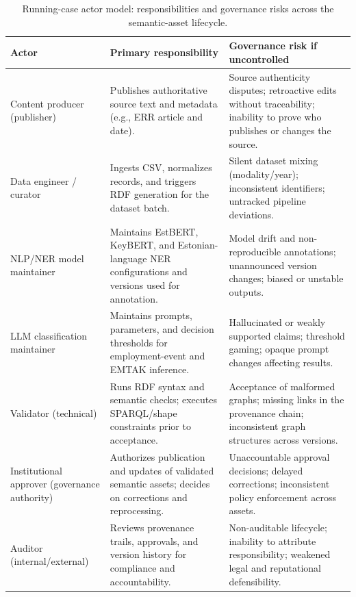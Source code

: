 \documentclass[journal]{IEEEtran}
\begin{document}
\begin{table}[t]
\caption{Running-case actor model: responsibilities and governance
risks across the semantic-asset lifecycle.}
\label{tab:runningcase_actors}
\centering
\renewcommand{\arraystretch}{1.15}
\setlength{\tabcolsep}{3.5pt}
\begin{tabular}{p{5.0cm} p{6cm} p{6cm}}
\hline
\textbf{Actor} &
\textbf{Primary responsibility} &
\textbf{Governance risk if uncontrolled}\\
\hline

Content producer (publisher) &
Publishes authoritative source text and metadata
(e.g., ERR article and date). &
Source authenticity disputes; retroactive edits without
traceability; inability to prove who publishes or changes
the source.\\

Data engineer / curator &
Ingests CSV, normalizes records, and triggers RDF generation
for the dataset batch. &
Silent dataset mixing (modality/year); inconsistent identifiers;
untracked pipeline deviations.\\

NLP/NER model maintainer &
Maintains EstBERT, KeyBERT, and Estonian-language NER
configurations and versions used for annotation. &
Model drift and non-reproducible annotations; unannounced
version changes; biased or unstable outputs.\\

LLM classification maintainer &
Maintains prompts, parameters, and decision thresholds
for employment-event and EMTAK inference. &
Hallucinated or weakly supported claims; threshold gaming;
opaque prompt changes affecting results.\\

Validator (technical) &
Runs RDF syntax and semantic checks; executes
SPARQL/shape constraints prior to acceptance. &
Acceptance of malformed graphs; missing links in the
provenance chain; inconsistent graph structures across versions.\\

Institutional approver (governance authority) &
Authorizes publication and updates of validated semantic assets;
decides on corrections and reprocessing. &
Unaccountable approval decisions; delayed corrections;
inconsistent policy enforcement across assets.\\

Auditor (internal/external) &
Reviews provenance trails, approvals, and version history
for compliance and accountability. &
Non-auditable lifecycle; inability to attribute responsibility;
weakened legal and reputational defensibility.\\

\hline
\end{tabular}
\end{table}
\end{document}
